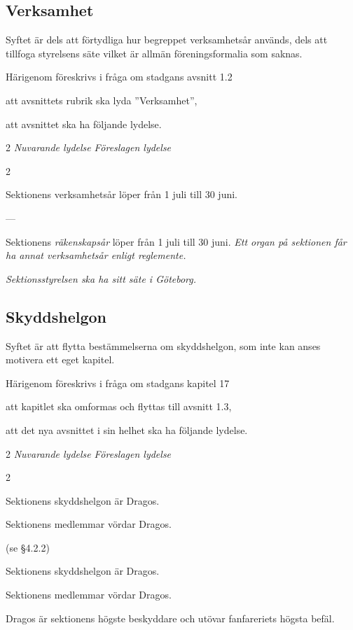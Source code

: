 \documentclass{article}
\newenvironment{lydelse}
    {\begin{paracol}{2}%
        \emph{Nuvarande lydelse}%
        \switchcolumn%
        \emph{Föreslagen lydelse}%
    \end{paracol}%
    \begin{enumerate}[label=\thesubsection.\arabic*]%
    \begin{paracol}{2}%
    }{\end{paracol}\end{enumerate}}
\begin{document}
\subsection{Verksamhet}
Syftet är dels att förtydliga hur begreppet verksamhetsår används, dels att tillfoga styrelsens säte vilket är allmän föreningsformalia som saknas.

Härigenom föreskrivs i fråga om stadgans avsnitt 1.2
\begin{dels}
    \item att avsnittets rubrik ska lyda ''Verksamhet'',
    \item att avsnittet ska ha följande lydelse.
\end{dels}

\begin{lydelse}
    \item Sektionens verksamhetsår löper från 1 juli till 30 juni.
    \item[] ---
  \switchcolumn
    \item Sektionens \emph{räkenskapsår} löper från 1 juli till 30 juni. \emph{Ett organ på sektionen får ha annat verksamhetsår enligt reglemente.}
    \item \emph{Sektionsstyrelsen ska ha sitt säte i Göteborg.}
\end{lydelse}

\subsection{Skyddshelgon}
Syftet är att flytta bestämmelserna om skyddshelgon, som inte kan anses motivera ett eget kapitel.

Härigenom föreskrivs i fråga om stadgans kapitel 17
\begin{dels}
    \item att kapitlet ska omformas och flyttas till avsnitt 1.3,
    \item att det nya avsnittet i sin helhet ska ha följande lydelse.
\end{dels}

\begin{lydelse}
  \setcounter{section}{17}
  \setcounter{subsection}{1}
    \item Sektionens skyddshelgon är Dragos.
    \item Sektionens medlemmar vördar Dragos.
    \item[] (se \S 4.2.2)
  \setcounter{section}{1}
  \setcounter{subsection}{3}
  \switchcolumn   
  \setcounter{enumi}{0}
    \item Sektionens skyddshelgon är Dragos.
    \item Sektionens medlemmar vördar Dragos.
    \item Dragos är sektionens högste beskyddare och utövar fanfareriets högsta befäl.
      \label{1.3:beskyddare}
\end{lydelse}
\end{document}
